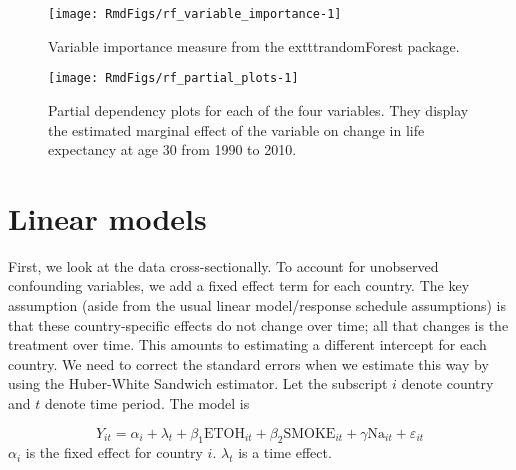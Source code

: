 \documentclass[11pt]{article}\usepackage[]{graphicx}\usepackage[]{color}
\makeatletter
\def\maxwidth{ %
  \ifdim\Gin@nat@width>\linewidth
    \linewidth
  \else
    \Gin@nat@width
  \fi
}
\newenvironment{knitrout}{}{} %
\newcommand{\eps}{\varepsilon}
\makeatother
\begin{document}
\begin{knitrout}
\color{fgcolor}\begin{figure}

{\centering \texttt{[image: RmdFigs/rf\_variable\_importance-1]} 

}

\caption[Variable importance measure from the 	exttt{randomForest} package]{Variable importance measure from the 	exttt{randomForest} package.}\label{fig:rf_variable_importance}
\end{figure}


\end{knitrout}
\begin{knitrout}
\color{fgcolor}\begin{figure}

{\centering \texttt{[image: RmdFigs/rf\_partial\_plots-1]} 

}

\caption[Partial dependency plots for each of the four variables]{Partial dependency plots for each of the four variables. They display the estimated marginal effect of the variable on change in life expectancy at age 30 from 1990 to 2010.}\label{fig:rf_partial_plots}
\end{figure}


\end{knitrout}

\newpage

\section{Linear models}


First, we look at the data cross-sectionally.
To account for unobserved confounding variables, we add a fixed effect term for each country.
The key assumption (aside from the usual linear model/response schedule assumptions) is that these country-specific effects do not change over time; all that changes is the treatment over time.
This amounts to estimating a different intercept for each country.
We need to correct the standard errors when we estimate this way by using the Huber-White Sandwich estimator.
Let the subscript $i$ denote country and $t$ denote time period.
The model is

$$Y_{it} = \alpha_i + \lambda_t + \beta_1\text{ETOH}_{it} +  \beta_2\text{SMOKE}_{it} + \gamma\text{Na}_{it} + \eps_{it}$$
$\alpha_i$ is the fixed effect for country $i$.
$\lambda_t$ is a time effect.
\end{document}
